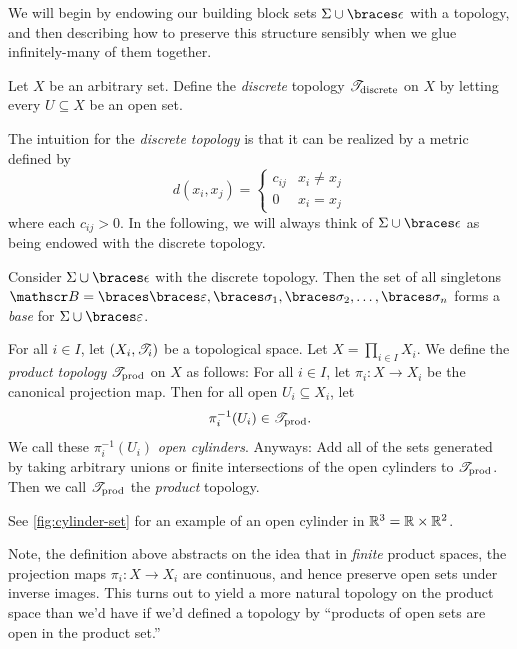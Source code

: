 \documentclass{fkpaper}
\begin{document}
\begin{multicols}{2}
We will begin by endowing our building block sets $\Sigma \cup
\set{\epsilon}$ with a topology, and then describing how to preserve
this structure sensibly when we glue infinitely-many of them together.
\begin{definition}
  Let $X$ be an arbitrary set. Define the \emph{discrete} topology
  ${\mathscr{T}}_{\rm discrete}$ on $X$ by letting every $U \subseteq X$ be an
  open set.
\end{definition}
The intuition for the \emph{discrete topology} is that it can be
realized by a metric defined by
\[
  d(x_i, x_j) =
  \begin{cases}
    c_{ij} & x_i \neq x_j \\
    0 & x_i = x_j
  \end{cases}
\]
where each $c_{ij} > 0$. In the following, we will always think of
$\Sigma \cup \set{\epsilon}$ as being endowed with the discrete
topology.
\begin{proposition}\label{prop:basis-for-strings}
  Consider $\Sigma \cup \set{\epsilon}$ with the discrete topology.
  Then the set of all singletons $\ms B = \set{\set{\varepsilon},
    \set{\sigma_1}, \set{\sigma_2}, \ldots, \set{\sigma_n}}$ forms a
  \emph{base} for $\Sigma \cup \set{\varepsilon}$.
\end{proposition}

\begin{definition}
  For all $i \in I$, let $(X_i, {\mathscr{T}}_i)$ be a topological space. Let
  $X = \prod_{i \in I} X_i$. We define the \emph{product topology}
  ${\mathscr{T}}_{\rm prod}$ on $X$ as follows: For all $i \in I$, let $\pi_i
  : X \to X_i$ be the canonical projection map. Then for all open $U_i
  \subseteq X_i$, let
  \[
    \pi_i^{-1}(U_i) \in {\mathscr{T}}_{\rm prod}.
  \]
  We call these $\pi_i^{-1}(U_i)$ \emph{open cylinders}. Anyways: Add
  all of the sets generated by taking arbitrary unions or finite
  intersections of the open cylinders to ${\mathscr{T}}_{\rm prod}$. Then we
  call ${\mathscr{T}}_{\rm prod}$ the \emph{product} topology. \qedhere
\end{definition}
See \cref{fig:cylinder-set} for an example of an open cylinder in
$\mathbb{R}^3 = \mathbb{R} \times \mathbb{R}^2$.

Note, the definition above abstracts on the idea that in \emph{finite}
product spaces, the projection maps $\pi_i : X \to X_i$ are
continuous, and hence preserve open sets under inverse images. This
turns out to yield a more natural topology on the product space than
we'd have if we'd defined a topology by ``products of open sets are
open in the product set.''


\end{multicols}
\end{document}

